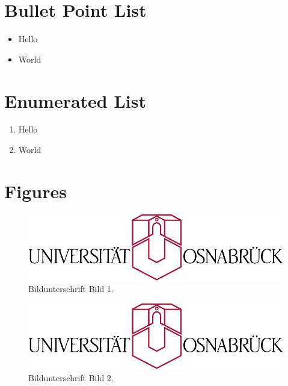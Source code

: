 	
	\section{Bullet Point List}
		\begin{itemize}
			\item 
			Hello
			
			\item 
			World
		\end{itemize}
	
	\section{Enumerated List}
		\begin{enumerate}
			\item 
			Hello
			
			\item 
			World
		\end{enumerate}

	\section{Figures}
		\begin{figure}
			\centering
			\includegraphics[scale=0.5]{figures/unilogo.pdf} %
			\caption{Bildunterschrift Bild 1.}
			\label{fig:referenceToFigure1}
		\end{figure}
	
		\begin{figure}
			\centering
			\includegraphics[width=1\linewidth]{figures/unilogo.pdf} %
			\caption{Bildunterschrift Bild 2.}
			\label{fig:referenceToFigure2}
		\end{figure}
	
